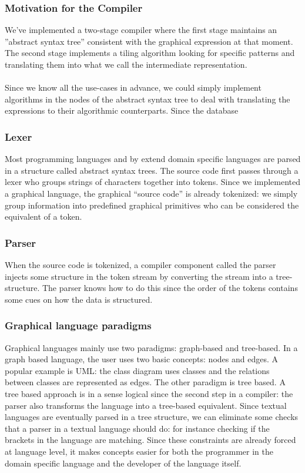 \subsubsection{Motivation for the Compiler}
\label{sssection:motivation_for_the_compiler}
We've implemented a two-stage compiler where the first stage maintains an
''abstract syntax tree'' consistent with the graphical expression at that
moment. The second stage implements a tiling algorithm looking for specific
patterns and translating them into what we call the intermediate representation.
\paragraph{}
Since we know all the use-cases in advance, we could simply implement
algorithms in the nodes of the abstract syntax tree to deal with translating
the expressions to their algorithmic counterparts. Since the database
\subsubsection{Lexer}
Most programming languages and by extend domain specific languages are parsed
in a structure called abstract syntax trees. The source code first passes
through a lexer who groups strings of characters together into tokens. Since we
implemented a graphical language, the graphical ``source code'' is already
tokenized: we simply group information into predefined graphical primitives who
can be considered the equivalent of a token.
\subsubsection{Parser}
When the source code is tokenized, a compiler component called the parser
injects some structure in the token stream by converting the stream into a
tree-structure. The parser knows how to do this since the order of the tokens
contains some cues on how the data is structured.
\subsubsection{Graphical language paradigms}
Graphical languages mainly use two paradigms: graph-based and tree-based. In a
graph based language, the user uses two basic concepts: nodes and edges. A
popular example is UML: the class diagram uses classes and the relations
between classes are represented as edges. The other paradigm is tree based. A
tree based approach is in a sense logical since the second step in a compiler:
the parser also transforms the language into a tree-based equivalent. Since
textual languages are eventually parsed in a tree structure, we can eliminate
some checks that a parser in a textual language should do: for instance
checking if the brackets in the language are matching. Since these constraints
are already forced at language level, it makes concepts easier for both the
programmer in the domain specific language and the developer of the language
itself.

